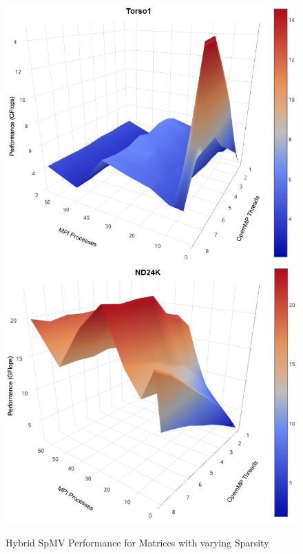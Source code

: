 \begin{figure}
\begin{centering}
		\includegraphics[scale=0.25]{figures/torso1_surface.jpg}
		\includegraphics[scale=0.25]{figures/nd24k_surface.jpg}
		\caption{Hybrid SpMV Performance for Matrices with varying Sparsity}
		\label{fig:spmv-matrix-surfaces}
\end{centering}\end{figure}

